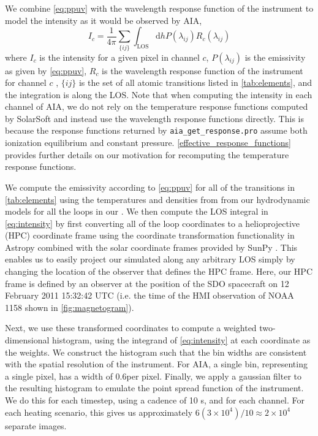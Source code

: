 We combine \autoref{eq:ppuv} with the wavelength response function of the instrument to model the intensity as it would be observed by AIA,
\begin{equation}\label{eq:intensity}
    I_c = \frac{1}{4\pi}\sum_{\{ij\}}\int_{\text{LOS}}\mathrm{d}hP(\lambda_{ij})R_c(\lambda_{ij})
\end{equation}
where $I_c$ is the intensity for a given pixel in channel $c$, $P(\lambda_{ij})$ is the emissivity as given by \autoref{eq:ppuv}, $R_c$ is the wavelength response function of the instrument for channel $c$ \citep[see][]{boerner_initial_2012}, $\{ij\}$ is the set of all atomic transitions listed in \autoref{tab:elements}, and the integration is along the LOS. Note that when computing the intensity in each channel of AIA, we do not rely on the temperature response functions computed by SolarSoft \citep{freeland_data_1998} and instead use the wavelength response functions directly. This is because the response functions returned by \texttt{aia\_get\_response.pro} assume both ionization equilibrium and constant pressure. \autoref{effective_response_functions} provides further details on our motivation for recomputing the temperature response functions.

We compute the emissivity according to \autoref{eq:ppuv} for all of the transitions in \autoref{tab:elements} using the temperatures and densities from from our hydrodynamic models for all the loops in our \AR{}. We then compute the LOS integral in \autoref{eq:intensity} by first converting all of the loop coordinates to a helioprojective (HPC) coordinate frame \citep[see][]{thompson_coordinate_2006} using the coordinate transformation functionality in Astropy \citep{the_astropy_collaboration_astropy_2018} combined with the solar coordinate frames provided by SunPy \citep{sunpy_community_sunpypython_2015}. This enables us to easily project our simulated \AR{} along any arbitrary LOS simply by changing the location of the observer that defines the HPC frame. Here, our HPC frame is defined by an observer at the position of the SDO spacecraft on 12 February 2011 15:32:42 UTC (i.e. the time of the HMI observation of NOAA 1158 shown in \autoref{fig:magnetogram}).

Next, we use these transformed coordinates to compute a weighted two-dimensional histogram, using the integrand of \autoref{eq:intensity} at each coordinate as the weights. We construct the histogram such that the bin widths are consistent with the spatial resolution of the instrument. For AIA, a single bin, representing a single pixel, has a width of 0.6\arcsec per pixel. Finally, we  apply a gaussian filter to the resulting histogram to emulate the point spread function of the instrument. We do this for each timestep, using a cadence of 10 s, and for each channel. For each heating scenario, this gives us approximately $6(3\times10^4)/10\approx2\times10^4$ separate images.
